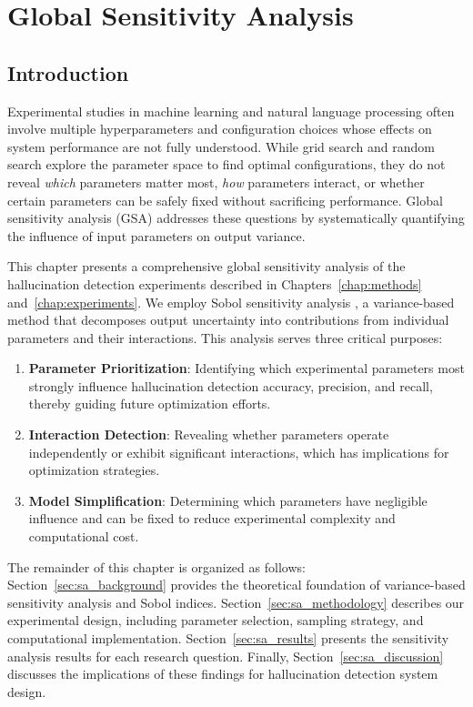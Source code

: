 \chapter{Global Sensitivity Analysis}
\label{chap:sensitivity}

\section{Introduction}

Experimental studies in machine learning and natural language processing often involve multiple hyperparameters and configuration choices whose effects on system performance are not fully understood. While grid search and random search explore the parameter space to find optimal configurations, they do not reveal \emph{which} parameters matter most, \emph{how} parameters interact, or whether certain parameters can be safely fixed without sacrificing performance. Global sensitivity analysis (GSA) addresses these questions by systematically quantifying the influence of input parameters on output variance.

This chapter presents a comprehensive global sensitivity analysis of the hallucination detection experiments described in Chapters~\ref{chap:methods} and~\ref{chap:experiments}. We employ Sobol sensitivity analysis \citep{sobol1993sensitivity, saltelli2010variance}, a variance-based method that decomposes output uncertainty into contributions from individual parameters and their interactions. This analysis serves three critical purposes:

\begin{enumerate}
    \item \textbf{Parameter Prioritization}: Identifying which experimental parameters most strongly influence hallucination detection accuracy, precision, and recall, thereby guiding future optimization efforts.
    
    \item \textbf{Interaction Detection}: Revealing whether parameters operate independently or exhibit significant interactions, which has implications for optimization strategies.
    
    \item \textbf{Model Simplification}: Determining which parameters have negligible influence and can be fixed to reduce experimental complexity and computational cost.
\end{enumerate}

The remainder of this chapter is organized as follows: Section~\ref{sec:sa_background} provides the theoretical foundation of variance-based sensitivity analysis and Sobol indices. Section~\ref{sec:sa_methodology} describes our experimental design, including parameter selection, sampling strategy, and computational implementation. Section~\ref{sec:sa_results} presents the sensitivity analysis results for each research question. Finally, Section~\ref{sec:sa_discussion} discusses the implications of these findings for hallucination detection system design.

